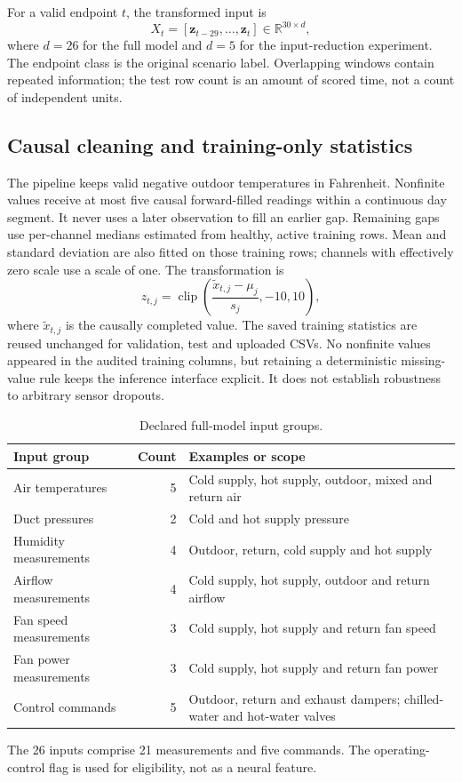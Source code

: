For a valid endpoint $t$, the transformed input is
\begin{equation}
X_t=[\mathbf{z}_{t-29},\ldots,\mathbf{z}_{t}]\in\mathbb{R}^{30\times d},
\end{equation}
where $d=26$ for the full model and $d=5$ for the input-reduction experiment. The endpoint class is the original scenario label. Overlapping windows contain repeated information; the test row count is an amount of scored time, not a count of independent units.

\subsection{Causal cleaning and training-only statistics}
The pipeline keeps valid negative outdoor temperatures in Fahrenheit. Nonfinite values receive at most five causal forward-filled readings within a continuous day segment. It never uses a later observation to fill an earlier gap. Remaining gaps use per-channel medians estimated from healthy, active training rows. Mean and standard deviation are also fitted on those training rows; channels with effectively zero scale use a scale of one. The transformation is
\begin{equation}
z_{t,j}=\operatorname{clip}\!\left(\frac{\widetilde{x}_{t,j}-\mu_j}{s_j},-10,10\right),
\end{equation}
where $\widetilde{x}_{t,j}$ is the causally completed value. The saved training statistics are reused unchanged for validation, test and uploaded CSVs. No nonfinite values appeared in the audited training columns, but retaining a deterministic missing-value rule keeps the inference interface explicit. It does not establish robustness to arbitrary sensor dropouts.

\begin{table}[htbp]\centering\small
\caption{Declared full-model input groups.}\label{tab:inputs}
\begin{tabularx}{\linewidth}{X r X}
\toprule
Input group & Count & Examples or scope \\
\midrule
Air temperatures & 5 & Cold supply, hot supply, outdoor, mixed and return air \\
Duct pressures & 2 & Cold and hot supply pressure \\
Humidity measurements & 4 & Outdoor, return, cold supply and hot supply \\
Airflow measurements & 4 & Cold supply, hot supply, outdoor and return airflow \\
Fan speed measurements & 3 & Cold supply, hot supply and return fan speed \\
Fan power measurements & 3 & Cold supply, hot supply and return fan power \\
Control commands & 5 & Outdoor, return and exhaust dampers; chilled-water and hot-water valves \\
\bottomrule\end{tabularx}
\par\smallskip\footnotesize The 26 inputs comprise 21 measurements and five commands. The operating-control flag is used for eligibility, not as a neural feature.
\end{table}


